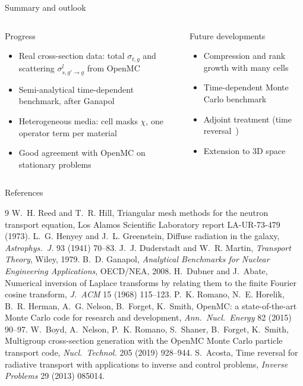 \documentclass[aspectratio=169,11pt]{beamer}
\begin{document}
\begin{frame}{Summary and outlook}
\begin{columns}[T,onlytextwidth]
\begin{block}{Progress}
\small
\begin{itemize}
\item Real cross-section data: total $\sigma_{t,g}$ and scattering $\sigma^{l}_{s,g'\to g}$ from OpenMC
\item Semi-analytical time-dependent benchmark, after Ganapol~\cite{Ganapol}
\item Heterogeneous media: cell masks $\chi$, one operator term per material
\item Good agreement with OpenMC on stationary problems
\end{itemize}
\end{block}
\begin{block}{Future developments}
\small
\begin{itemize}
\item Compression and rank growth with many cells
\item Time-dependent Monte Carlo benchmark
\item Adjoint treatment (time reversal~\cite{Acosta})
\item Extension to 3D space
\end{itemize}
\end{block}
\end{columns}
\end{frame}

\begin{frame}{References}
\scriptsize
\begin{thebibliography}{9}
\setlength{\itemsep}{0pt}\scriptsize
{} W.~H. Reed and T.~R. Hill, Triangular mesh methods for the neutron transport equation, Los Alamos Scientific Laboratory report LA-UR-73-479 (1973).
 L.~G. Henyey and J.~L. Greenstein, Diffuse radiation in the galaxy, \emph{Astrophys.\ J.} 93 (1941) 70--83.
 J.~J. Duderstadt and W.~R. Martin, \emph{Transport Theory}, Wiley, 1979.
 B.~D. Ganapol, \emph{Analytical Benchmarks for Nuclear Engineering Applications}, OECD/NEA, 2008.
 H.~Dubner and J.~Abate, Numerical inversion of Laplace transforms by relating them to the finite Fourier cosine transform, \emph{J.\ ACM} 15 (1968) 115--123.
 P.~K. Romano, N.~E. Horelik, B.~R. Herman, A.~G. Nelson, B.~Forget, K.~Smith, OpenMC: a state-of-the-art Monte Carlo code for research and development, \emph{Ann.\ Nucl.\ Energy} 82 (2015) 90--97.
 W.~Boyd, A.~Nelson, P.~K. Romano, S.~Shaner, B.~Forget, K.~Smith, Multigroup cross-section generation with the OpenMC Monte Carlo particle transport code, \emph{Nucl.\ Technol.} 205 (2019) 928--944.
 S.~Acosta, Time reversal for radiative transport with applications to inverse and control problems, \emph{Inverse Problems} 29 (2013) 085014.
\end{thebibliography}
\end{frame}
\end{document}
